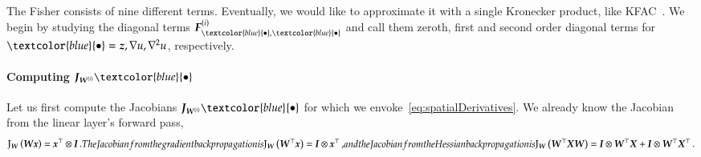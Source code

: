 The Fisher consists of nine different terms.
Eventually, we would like to approximate it with a single Kronecker product, like KFAC~\citep{martens2015optimizing}. 
We begin by studying the diagonal terms $\mF_{\textcolor{blue}{\bullet}, \textcolor{blue}{\bullet}}^{(i)}$ and call them zeroth, first and second order diagonal terms for $\textcolor{blue}{\bullet} = \vz, \nabla u, \nabla^2 u$, respectively.

\paragraph{Computing $\mJ_{\mW^{(i)}}\textcolor{blue}{\bullet}$} 
Let us first compute the Jacobians $\mJ_{\mW^{(i)}}\textcolor{blue}{\bullet}$ for which we envoke~\eqref{eq:spatialDerivatives}. 
We already know the Jacobian from the linear layer's forward pass,
\begin{subequations}\label{eq:fisher-jacobians}
  \begin{align}
    \jac_{\mW}\left( \mW \vx \right) = \vx^{\top} \otimes \mI\,.
  \end{align}
  The Jacobian from the gradient backpropagation is
  \begin{align}
    \jac_{\mW}\left( \mW^{\top} \vx \right) = \mI \otimes \vx^{\top}\,,
  \end{align}
  and the Jacobian from the Hessian backpropagation is
  \begin{align}
    \jac_{\mW}\left( \mW^{\top} \mX \mW \right) = \mI \otimes \mW^{\top}\mX + \mI \otimes \mW^{\top}\mX^{\top}\,.
  \end{align}
\end{subequations}

